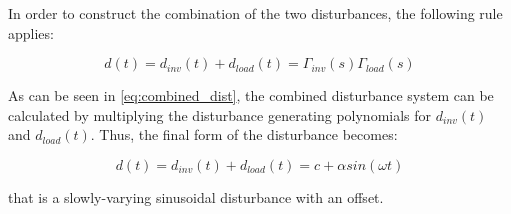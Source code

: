 In order to construct the combination of the two disturbances, the following rule applies: 

\begin{equation}
  \label{eq:combined_dist}
  d(t) = d_{inv}(t) + d_{load}(t) = \Gamma_{inv}(s)\Gamma_{load}(s)
  \end{equation}
  
As can be seen in \eqref{eq:combined_dist}, the combined disturbance system can be calculated by multiplying the disturbance generating polynomials for $d_{inv}(t)$ and $d_{load}(t)$. Thus, the final form of the disturbance becomes: 

\begin{equation}
  \label{eq:dist_final}
  d(t) = d_{inv}(t) + d_{load}(t) = c + \alpha sin(\omega t)
  \end{equation}

that is a slowly-varying sinusoidal disturbance with an offset. 